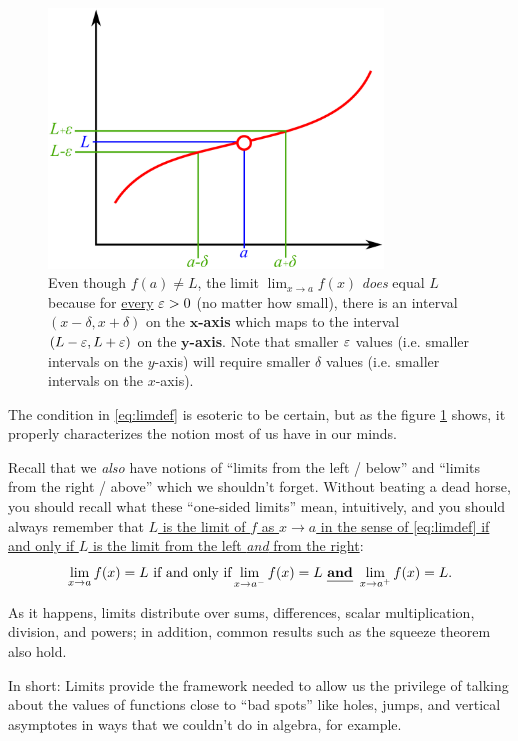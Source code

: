 \documentclass[12pt]{article}
\begin{document}
	\begin{figure}[h!]
		\centering
		\includegraphics[width=3.5in]{limit}
		\caption{Even though $f(a)\neq L$, the limit $\lim_{x\to a}f(x)$ \textit{does} equal $L$ because for \ul{every} $\varepsilon>0$ (no matter how small), there is an interval $(x-\delta,x+\delta)$ on the \textbf{$\boldsymbol{x}$-axis} which maps to the interval $(L-\varepsilon,L+\varepsilon)$ on the \textbf{$\boldsymbol{y}$-axis}. Note that smaller $\varepsilon$ values (i.e. smaller intervals on the $y$-axis) will require smaller $\delta$ values (i.e. smaller intervals on the $x$-axis).}
		\label{fig:limit}
	\end{figure}
	
	The condition in \eqref{eq:limdef} is esoteric to be certain, but as the figure \ref{fig:limit} shows, it properly characterizes the notion most of us have in our minds.
	
	Recall that we \textit{also} have notions of ``limits from the left / below'' and ``limits from the right / above'' which we shouldn't forget. Without beating a dead horse, you should recall what these ``one-sided limits'' mean, intuitively, and you should always remember that \ul{$L$ is the limit of $f$ as $x\to a$ in the sense of {\eqref{eq:limdef}} if and only if $L$ is the limit from the left \textit{and} from the right}:
	$$\lim_{x\to a}f(x)=L\text{ if and only if}\lim_{x\to a^-}f(x)=L\text{ \ul{\textbf{and}} }\lim_{x\to a^+}f(x)=L.$$
	
	As it happens, limits distribute over sums, differences, scalar multiplication, division, and powers; in addition, common results such as the squeeze theorem also hold.
	
	In short: Limits provide the framework needed to allow us the privilege of talking about the values of functions close to ``bad spots'' like holes, jumps, and vertical asymptotes in ways that we couldn't do in algebra, for example. 
	
\end{document}
